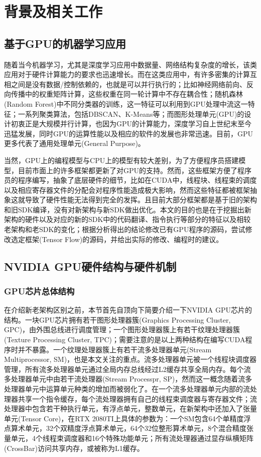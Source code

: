 \newpage
\section{背景及相关工作}
\setcounter{table}{0}
\setcounter{figure}{0}
\subsection{基于GPU的机器学习应用}
\par 随着当今机器学习，尤其是深度学习应用中数据量、网络结构复杂度的增长，该类应用对于硬件计算能力的要求也迅速增长。而在这类应用中，有许多密集的计算互相之间是没有数据/控制依赖的，也就是可以并行执行的；比如神经网络前向、反向传播中的权重矩阵计算，这些权重在同一轮计算中不存在耦合性；随机森林(Random Forest)中不同分类器的训练，这一特征可以利用到GPU处理中流这一特征；一系列聚类算法，包括DBSCAN、K-Means等；而图形处理单元(GPU)的设计初衷正是大规模并行计算，也因为GPU的计算能力，深度学习自上世纪末至今迅猛发展，同时GPU的运算性能以及相应的软件的发展也非常迅速。目前，GPU更多代表了通用处理单元(General Purpose)。
\par 当然，GPU上的编程模型与CPU上的模型有较大差别，为了方便程序员搭建模型，目前市面上的许多框架都更新了对GPU的支持。然而，这些框架方便了程序员的程序编写，抽象了底层硬件的细节，比如在CUDA中，线程块、线程束的调度以及相应寄存器文件的分配会对程序性能造成极大影响，然而这些特征都被框架抽象这就导致了硬件性能无法得到完全的发挥。且目前大部分框架都是基于旧的架构和旧SDK编译，没有对新架构与新SDK做出优化。本文的目的也是在于挖掘出新架构的硬件以及对应的新的SDK中的代码翻译、指令执行等部分的特征以及相较老架构和老SDK的变化；根据分析得出的结论修改已有GPU程序的源码，尝试修改选定框架(Tensor Flow)的源码，并给出实际的修改、编程时的建议。

\subsection{NVIDIA GPU硬件结构与硬件机制}
\subsubsection{GPU芯片总体结构} 
\par 在介绍新老架构区别之前，本节首先自顶向下简要介绍一下NVIDIA GPU芯片的结构。一块GPU芯片拥有若干图形处理器簇(Graphics Processing Cluster, GPC)，由外围总线进行调度管理；一个图形处理器簇上有若干纹理处理器簇(Texture Processing Cluster, TPC)；需要注意的是以上两种结构在编写CUDA程序时并不暴露。一个纹理处理器簇上有若干流多处理器单元(Stream Multiprocessor, SM)，也是本文关注的重点。流多处理器单元被一个线程块调度器管理，所有流多处理器单元通过全局内存总线经过L2缓存共享全局内存。每个流多处理器单元中由若干流处理器(Stream Processpr, SP)，然而这一概念随着流多处理器单元中运算单元种类的增加而被弱化了。在一个流多处理器单元内部的流处理器共享一个指令缓存，每个流处理器拥有自己的线程束调度器与寄存器文件；流处理器中包含若干种执行单元，有浮点单元，整数单元，在新架构中还加入了张量单元(Tensor Core)，在RTX 2080TI上具体的参数为：一个SM包含64个单精度浮点算术单元，32个双精度浮点算术单元，64个32位整形算术单元，8个混合精度张量单元，4个线程束调度器和16个特殊功能单元；所有流处理器通过显存纵横矩阵(CrossBar)访问共享内存，或被称为L1缓存\parencite{EXPLORING}。
